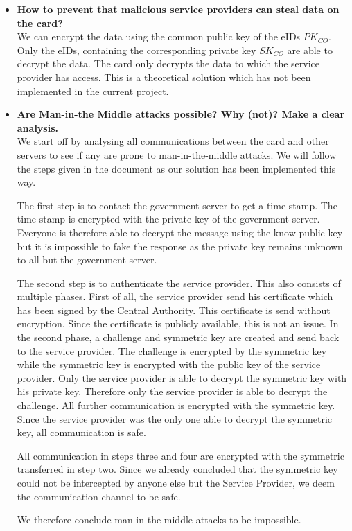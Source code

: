 \documentclass[12pt]{report}
\begin{document}
\begin{itemize}
\item \textbf{How to prevent that malicious service providers can steal data on the card?}\\
We can encrypt the data using the common public key of the eIDs $PK_{CO}$. Only the eIDs, containing the corresponding private key $SK_{CO}$ are able to decrypt the data. The card only decrypts the data to which the service provider has access. This is a theoretical solution which has not been implemented in the current project.

\item \textbf{Are Man-in-the Middle attacks possible? Why (not)? Make a clear analysis.}\\
We start off by analysing all communications between the card and other servers to see if any are prone to man-in-the-middle attacks. We will follow the steps given in the document as our solution has been implemented this way.

The first step is to contact the government server to get a time stamp. The time stamp is encrypted with the private key of the government server. Everyone is therefore able to decrypt the message using the know public key but it is impossible to fake the response as the private key remains unknown to all but the government server.

The second step is to authenticate the service provider. This also consists of multiple phases. First of all, the service provider send his certificate which has been signed by the Central Authority. This certificate is send without encryption. Since the certificate is publicly available, this is not an issue.
In the second phase, a challenge and symmetric key are created and send back to the service provider. The challenge is encrypted by the symmetric key while the symmetric key is encrypted with the public key of the service provider. Only the service provider is able to decrypt the symmetric key with his private key. Therefore only the service provider is able to decrypt the challenge. All further communication is encrypted with the symmetric key. Since the service provider was the only one able to decrypt the symmetric key, all communication is safe.

All communication in steps three and four are encrypted with the symmetric transferred in step two. Since we already concluded that the symmetric key could not be intercepted by anyone else but the Service Provider, we deem the communication channel to be safe.

We therefore conclude man-in-the-middle attacks to be impossible.


\end{itemize}
\end{document}
